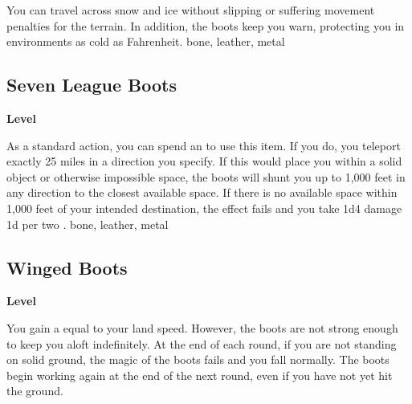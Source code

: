 \vspace{-1.5em}  %
You can travel across snow and ice without slipping or suffering movement penalties for the terrain.
In addition, the boots keep you warn, protecting you in environments as cold as  Fahrenheit.
 
 bone, leather, metal
\begin{multicols}{2}
\lowercase{\hypertarget{item:Seven League Boots}{}}\label{item:Seven League Boots}
\hypertarget{item:Seven League Boots}{\subsection{Seven League Boots}}
\columnbreak%
\begin{flushright}
\large\textbf{ Level}
\end{flushright}
\end{multicols}
\vspace{-1.5em}  %
As a standard action, you can spend an  to use this item.
If you do, you teleport exactly 25 miles in a direction you specify.
If this would place you within a solid object or otherwise impossible space, the boots will shunt you up to 1,000 feet in any direction to the closest available space.
If there is no available space within 1,000 feet of your intended destination, the effect fails and you take 1d4 damage \plus1d per two .
 
 bone, leather, metal
\begin{multicols}{2}
\lowercase{\hypertarget{item:Winged Boots}{}}\label{item:Winged Boots}
\hypertarget{item:Winged Boots}{\subsection{Winged Boots}}
\columnbreak%
\begin{flushright}
\large\textbf{ Level}
\end{flushright}
\end{multicols}
\vspace{-1.5em}  %
You gain a  equal to your land speed.
However, the boots are not strong enough to keep you aloft indefinitely.
At the end of each round, if you are not standing on solid ground, the magic of the boots fails and you fall normally.
The boots begin working again at the end of the next round, even if you have not yet hit the ground.
